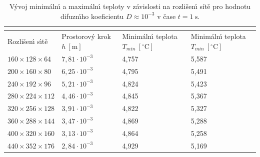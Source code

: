             \begin{table}[H]
                \centering
                \begin{tabular}{p{}p{}p{}p{}}
                    \toprule
                    \multicolumn{4}{c}{\centering{$t=1.0 \ \mathrm{s}$}} \\ \midrule
                    Rozli\v{s}en\'{\i} s\'{\i}t\v{e} & \multicolumn{1}{p{2.5cm}}{Prostorov\'{y} krok $h \ [\mathrm{m}]$} & \multicolumn{1}{p{2.8cm}}{Minim\'{a}ln\'{\i} teplota $T_{min} \ [^\circ\mathrm{C}]$} & \multicolumn{1}{p{2.8cm}}{Minim\'{a}ln\'{\i} teplota $T_{min} \ [^\circ\mathrm{C}]$} \\ \midrule
                    $160 \times 128 \times 64$  & $7,81 \cdot  10^{-3}$ & 4,757 & 5,587 \\
                    $200 \times 160 \times 80$  & $6,25 \cdot  10^{-3}$ & 4,795 & 5,491 \\
                    $240 \times 192 \times 96$  & $5,21 \cdot  10^{-3}$ & 4,824 & 5,423 \\
                    $280 \times 224 \times 112$  & $4,46 \cdot  10^{-3}$ & 4,845 & 5,367 \\
                    $320 \times 256 \times 128$  & $3,91 \cdot  10^{-3}$ & 4,822 & 5,327 \\
                    $360 \times 288 \times 144$  & $3,47 \cdot  10^{-3}$ & 4,869 & 5,288 \\
                    $400 \times 320 \times 160$  & $3,13 \cdot  10^{-3}$ & 4,864 & 5,258 \\
                    $440 \times 352 \times 176$  & $2,84 \cdot  10^{-3}$ & 4,929 & 5,169 \\ 
                    \bottomrule

                \end{tabular}

                \caption{V\'{y}voj minim\'{a}ln\'{\i} a maxim\'{a}ln\'{\i} teploty v z\'{a}vislosti na rozli\v{s}en\'{\i} s\'{i}t\v{e} pro hodnotu difuzn\'{\i}ho koeficientu $D \approx 10^{-3}$ v \v{c}ase $t = 1 \ \mathrm{s}$.}
                \label{table:D10m3_1}
            \end{table}


